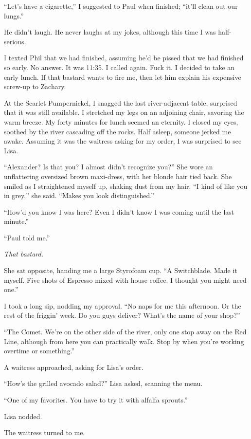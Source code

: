 ``Let's have a cigarette,'' I suggested to Paul when finished; ``it'll
clean out our lungs.''

He didn't laugh. He never laughs at my jokes, although this time I was
half-serious.

I texted Phil that we had finished, assuming he'd be pissed that we had
finished so early. No answer. It was 11:35. I called again. Fuck it. I
decided to take an early lunch. If that bastard wants to fire me, then
let him explain his expensive screw-up to Zachary.

At the Scarlet Pumpernickel, I snagged the last river-adjacent table,
surprised that it was still available. I stretched my legs on an
adjoining chair, savoring the warm breeze. My forty minutes for lunch
seemed an eternity. I closed my eyes, soothed by the river cascading off
the rocks. Half asleep, someone jerked me awake. Assuming it was the
waitress asking for my order, I was surprised to see Lisa.

``Alexander? Is that you? I almost didn't recognize you?'' She wore an
unflattering oversized brown maxi-dress, with her blonde hair tied back.
She smiled as I straightened myself up, shaking dust from my hair. ``I
kind of like you in grey,'' she said. ``Makes you look distinguished.''

``How'd you know I was here? Even I didn't know I was coming until the
last minute.''

``Paul told me.''

\emph{That bastard.}

She sat opposite, handing me a large Styrofoam cup. ``A Switchblade.
Made it myself. Five shots of Espresso mixed with house coffee. I
thought you might need one.''

I took a long sip, nodding my approval. ``No naps for me this afternoon.
Or the rest of the friggin' week. Do you guys deliver? What's the name
of your shop?''

``The Comet. We're on the other side of the river, only one stop away on
the Red Line, although from here you can practically walk. Stop by when
you're working overtime or something.''

A waitress approached, asking for Lisa's order.

``How's the grilled avocado salad?'' Lisa asked, scanning the menu.

``One of my favorites. You have to try it with alfalfa sprouts.''

Lisa nodded.

The waitress turned to me.

